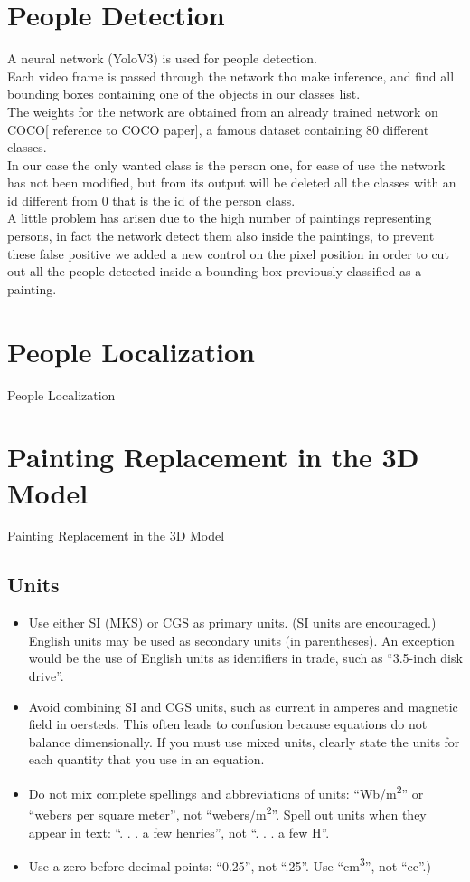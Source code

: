 \documentclass[conference]{IEEEtran}
\begin{document}
\section{People Detection}
A neural network (YoloV3) is used for people detection.\\
Each video frame is passed through the network tho make inference, and find all bounding boxes containing one of the objects in our classes list.\\
The weights for the network are obtained from an already trained network on COCO[ reference to COCO paper], a famous dataset containing 80 different classes.\\
In our case the only wanted class is the person one, for ease of use the network has not been modified, but from its output will be deleted all the classes with an id different from 0 that is the id of the person class.\\
A little problem has arisen due to the high number of paintings representing persons, in fact the network detect them also inside the paintings, to prevent these false positive we added a new control on the pixel position in order to cut out all the people detected inside a bounding box previously classified as a painting.


\section{People Localization}
People Localization

\section{Painting Replacement in the 3D Model}
Painting Replacement in the 3D Model


\subsection{Units}
\begin{itemize}
\item Use either SI (MKS) or CGS as primary units. (SI units are encouraged.) English units may be used as secondary units (in parentheses). An exception would be the use of English units as identifiers in trade, such as ``3.5-inch disk drive''.
\item Avoid combining SI and CGS units, such as current in amperes and magnetic field in oersteds. This often leads to confusion because equations do not balance dimensionally. If you must use mixed units, clearly state the units for each quantity that you use in an equation.
\item Do not mix complete spellings and abbreviations of units: ``Wb/m\textsuperscript{2}'' or ``webers per square meter'', not ``webers/m\textsuperscript{2}''. Spell out units when they appear in text: ``. . . a few henries'', not ``. . . a few H''.
\item Use a zero before decimal points: ``0.25'', not ``.25''. Use ``cm\textsuperscript{3}'', not ``cc''.)
\end{itemize}
\end{document}
